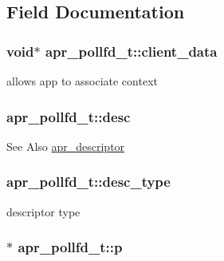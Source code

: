\subsection{Field Documentation}
\hypertarget{structapr__pollfd__t_a01220e7a71963456461baa40b2a05716}{
\subsubsection[{client\-\_\-data}]{\setlength{\rightskip}{0pt plus 5cm}void$\ast$ apr\-\_\-pollfd\-\_\-t\-::client\-\_\-data}}\label{structapr__pollfd__t_a01220e7a71963456461baa40b2a05716}
allows app to associate context \hypertarget{structapr__pollfd__t_ad63baa71bb91f80513d33482e28fb967}{
\subsubsection[{desc}]{ apr\-\_\-pollfd\-\_\-t\-::desc}}\label{structapr__pollfd__t_ad63baa71bb91f80513d33482e28fb967}
\begin{DoxySeeAlso}{See Also}
\hyperlink{unionapr__descriptor}{apr\-\_\-descriptor} 
\end{DoxySeeAlso}
\hypertarget{structapr__pollfd__t_acfafd260241a874745f49ba2df246c53}{
\subsubsection[{desc\-\_\-type}]{ apr\-\_\-pollfd\-\_\-t\-::desc\-\_\-type}}\label{structapr__pollfd__t_acfafd260241a874745f49ba2df246c53}
descriptor type \hypertarget{structapr__pollfd__t_adae68586ed671472590efe8770de38cc}{
\subsubsection[{p}]{$\ast$ apr\-\_\-pollfd\-\_\-t\-::p}}\label{structapr__pollfd__t_adae68586ed671472590efe8770de38cc}
